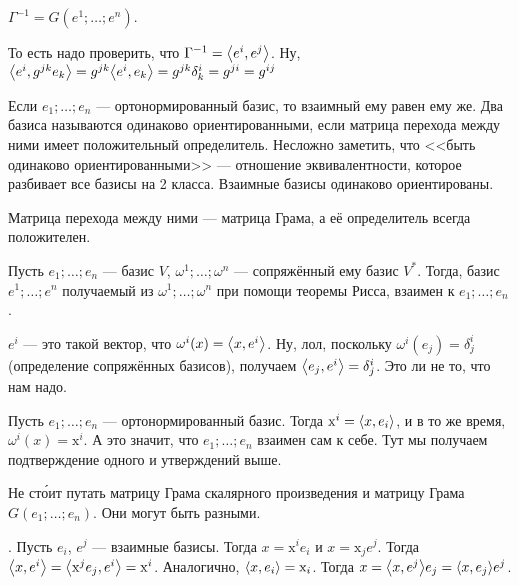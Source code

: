 \documentclass{article}
\begin{document}
\begin{itemize}
\begin{Proof}
        \end{Proof}
        \thm $\Gamma^{-1}=G(e^1;\ldots;e^n)$.
        \begin{Proof}
            То есть надо проверить, что $\Gamma^{-1}={\left\langle{e^i},{e^j}\right\rangle}$. Ну, ${\left\langle{e^i},{g^{jk}e_k}\right\rangle}=g^{jk}{\left\langle{e^i},{e_k}\right\rangle}=g^{jk}\delta^i_k=g^{ji}=g^{ij}$
        \end{Proof}
        \thm Если $e_1;\ldots;e_n$ --- ортонормированный базис, то взаимный ему равен ему же.
        \dfn Два базиса называются одинаково ориентированными, если матрица перехода между ними имеет положительный определитель.
        \thm Несложно заметить, что <<быть одинаково ориентированными>> --- отношение эквивалентности, которое разбивает все базисы на 2 класса.
        \thm Взаимные базисы одинаково ориентированы.
        \begin{Proof}
            Матрица перехода между ними --- матрица Грама, а её определитель всегда положителен.
        \end{Proof}
        \thm Пусть $e_1;\ldots;e_n$ --- базис $V$, $\omega^1;\ldots;\omega^n$ --- сопряжённый ему базис $V^*$. Тогда, базис $e^1;\ldots;e^n$ получаемый из $\omega^1;\ldots;\omega^n$ при помощи теоремы Рисса, взаимен к $e_1;\ldots;e_n$.
        \begin{Proof}
            $e^i$ --- это такой вектор, что $\omega^i(x)={\left\langle{x},{e^i}\right\rangle}$. Ну, лол, поскольку $\omega^i(e_j)=\delta^i_j$ (определение сопряжённых базисов), получаем ${\left\langle{e_j},{e^i}\right\rangle}=\delta^i_j$. Это ли не то, что нам надо.
        \end{Proof}
        \begin{Comment}
            Пусть $e_1;\ldots;e_n$ --- ортонормированный базис. Тогда $\mathrm x^i={\left\langle{x},{e_i}\right\rangle}$, и в то же время, $\omega^i(x)=\mathrm x^i$. А это значит, что $e_1;\ldots;e_n$ взаимен сам к себе. Тут мы получаем подтверждение одного и утверждений выше.
        \end{Comment}
        \begin{Comment}
            Не ст\'{о}ит путать матрицу Грама скалярного произведения и матрицу Грама $G(e_1;\ldots;e_n)$. Они могут быть разными.
        \end{Comment}
        \thm {}. Пусть $e_i$, $e^j$ --- взаимные базисы. Тогда $x=\mathrm x^ie_i$ и $x=\mathrm x_je^j$. Тогда ${\left\langle{x},{e^i}\right\rangle}={\left\langle{\mathrm x^je_j},{e^i}\right\rangle}=\mathrm x^i$. Аналогично, ${\left\langle{x},{e_i}\right\rangle}=\mathrm x_i$. Тогда $x={\left\langle{x},{e^j}\right\rangle}e_j={\left\langle{x},{e_j}\right\rangle}e^j$.
        \begin{Comment}

\end{Comment}
\end{itemize}
\end{document}
